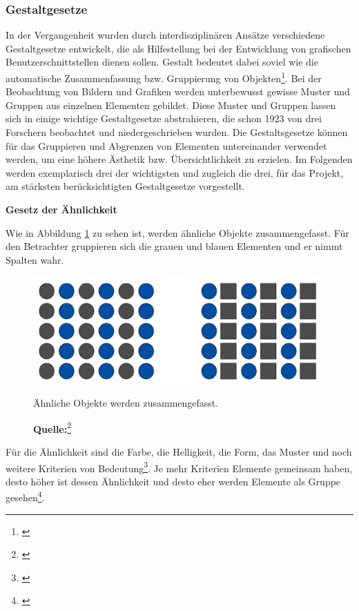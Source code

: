 
\subsubsection{Gestaltgesetze}
\label{sec:gestaltgesetze}
In der Vergangenheit wurden durch interdisziplinären Ansätze verschiedene Gestaltgesetze entwickelt, die als Hilfestellung bei der Entwicklung von grafischen Benutzerschnittstellen dienen sollen. Gestalt bedeutet dabei soviel wie die automatische Zusammenfassung bzw. Gruppierung von Objekten\footnote{\cite[vgl.][59]{Dahm2006}}. Bei der Beobachtung von Bildern und Grafiken werden unterbewusst gewisse Muster und Gruppen aus einzelnen Elementen gebildet. Diese Muster und Gruppen lassen sich in einige wichtige Gestaltgesetze abstrahieren, die schon 1923 von drei Forschern beobachtet und niedergeschrieben wurden. Die Gestaltsgesetze können für das Gruppieren und Abgrenzen von Elementen untereinander verwendet werden, um eine höhere Ästhetik bzw. Übersichtlichkeit zu erzielen. Im Folgenden werden exemplarisch drei der wichtigsten und zugleich die drei, für das Projekt, am stärksten berücksichtigten Gestaltgesetze vorgestellt.

\textbf{Gesetz der Ähnlichkeit}

Wie in Abbildung \ref{fig:aehnlichkeit} zu sehen ist, werden ähnliche Objekte zusammengefasst. Für den Betrachter gruppieren sich die grauen und blauen Elementen und er nimmt Spalten wahr.
\begin{figure}[H]
  \centering
  \includegraphics[scale=1]{img/gesetz_der_Aehnlichkeit.PNG}
  \caption{Ähnliche Objekte werden zusammengefasst.}
    \caption*{\textbf{Quelle:}\footnote{\cite{Dahm2006}}}
  \label{fig:aehnlichkeit}
\end{figure}
Für die Ähnlichkeit sind die Farbe, die Helligkeit, die Form, das Muster und noch weitere Kriterien von Bedeutung\footnote{\cite[vgl.][59f]{Dahm2006}}. Je mehr Kriterien Elemente gemeinsam haben, desto höher ist dessen Ähnlichkeit und desto eher werden Elemente als Gruppe gesehen\footnote{\cite[vgl.][]{HTMLSeminarDe}}.


